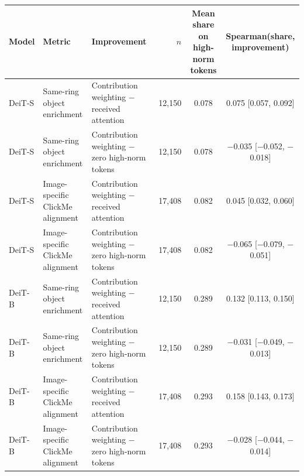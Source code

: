 \begin{tabular}{lllrcc}
\toprule
Model & Metric & Improvement & $n$ & \makecell{Mean share on\\high-norm tokens} & \makecell{Spearman(share,\\improvement)} \\
\midrule
DeiT-S & \makecell[l]{Same-ring object \\ enrichment} & \makecell[l]{Contribution weighting \\ $-$ received attention} & 12,150 & 0.078 & 0.075 {\scriptsize [0.057, 0.092]} \\
\addlinespace[2pt]
DeiT-S & \makecell[l]{Same-ring object \\ enrichment} & \makecell[l]{Contribution weighting \\ $-$ zero high-norm tokens} & 12,150 & 0.078 & $-$0.035 {\scriptsize [$-$0.052, $-$0.018]} \\
\addlinespace[2pt]
DeiT-S & \makecell[l]{Image-specific \\ ClickMe alignment} & \makecell[l]{Contribution weighting \\ $-$ received attention} & 17,408 & 0.082 & 0.045 {\scriptsize [0.032, 0.060]} \\
\addlinespace[2pt]
DeiT-S & \makecell[l]{Image-specific \\ ClickMe alignment} & \makecell[l]{Contribution weighting \\ $-$ zero high-norm tokens} & 17,408 & 0.082 & $-$0.065 {\scriptsize [$-$0.079, $-$0.051]} \\
\addlinespace[2pt]
DeiT-B & \makecell[l]{Same-ring object \\ enrichment} & \makecell[l]{Contribution weighting \\ $-$ received attention} & 12,150 & 0.289 & 0.132 {\scriptsize [0.113, 0.150]} \\
\addlinespace[2pt]
DeiT-B & \makecell[l]{Same-ring object \\ enrichment} & \makecell[l]{Contribution weighting \\ $-$ zero high-norm tokens} & 12,150 & 0.289 & $-$0.031 {\scriptsize [$-$0.049, $-$0.013]} \\
\addlinespace[2pt]
DeiT-B & \makecell[l]{Image-specific \\ ClickMe alignment} & \makecell[l]{Contribution weighting \\ $-$ received attention} & 17,408 & 0.293 & 0.158 {\scriptsize [0.143, 0.173]} \\
\addlinespace[2pt]
DeiT-B & \makecell[l]{Image-specific \\ ClickMe alignment} & \makecell[l]{Contribution weighting \\ $-$ zero high-norm tokens} & 17,408 & 0.293 & $-$0.028 {\scriptsize [$-$0.044, $-$0.014]} \\
\bottomrule
\end{tabular}
